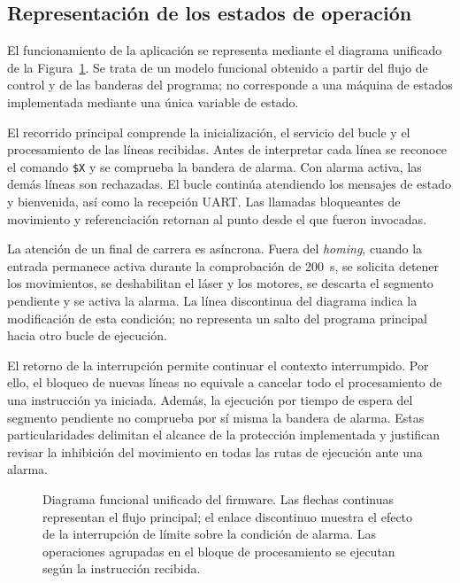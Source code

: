 \documentclass[blue,fullpaper]{ludusofficial}  %
\begin{document}
\subsection{Representación de los estados de operación}

El funcionamiento de la aplicación se representa mediante
el diagrama unificado de la Figura~\ref{fig:flujo-firmware}.
Se trata de un modelo funcional obtenido a partir del flujo
de control y de las banderas del programa; no corresponde
a una máquina de estados implementada mediante una única
variable de estado.

El recorrido principal comprende la inicialización,
el servicio del bucle y el procesamiento de las líneas
recibidas. Antes de interpretar cada línea se reconoce
el comando \texttt{\$X} y se comprueba la bandera de alarma.
Con alarma activa, las demás líneas son rechazadas.
El bucle continúa atendiendo los mensajes de estado
y bienvenida, así como la recepción UART. Las llamadas
bloqueantes de movimiento y referenciación retornan
al punto desde el que fueron invocadas.

La atención de un final de carrera es asíncrona.
Fuera del \textit{homing}, cuando la entrada permanece
activa durante la comprobación de 200~\textmu s,
se solicita detener los movimientos, se deshabilitan
el láser y los motores, se descarta el segmento pendiente
y se activa la alarma. La línea discontinua del diagrama
indica la modificación de esta condición; no representa
un salto del programa principal hacia otro bucle
de ejecución.

El retorno de la interrupción permite continuar
el contexto interrumpido. Por ello, el bloqueo de nuevas
líneas no equivale a cancelar todo el procesamiento
de una instrucción ya iniciada. Además, la ejecución
por tiempo de espera del segmento pendiente no comprueba
por sí misma la bandera de alarma. Estas particularidades
delimitan el alcance de la protección implementada
y justifican revisar la inhibición del movimiento
en todas las rutas de ejecución ante una alarma.

\begin{landscape}
    \begin{figure}[p]
        \centering

        \resizebox{\linewidth}{!}{%
        }

        \caption{Diagrama funcional unificado del firmware.
        Las flechas continuas representan el flujo principal;
        el enlace discontinuo muestra el efecto de la
        interrupción de límite sobre la condición de alarma.
        Las operaciones agrupadas en el bloque de procesamiento
        se ejecutan según la instrucción recibida.}

        \label{fig:flujo-firmware}
    \end{figure}
\end{landscape}
\end{document}
